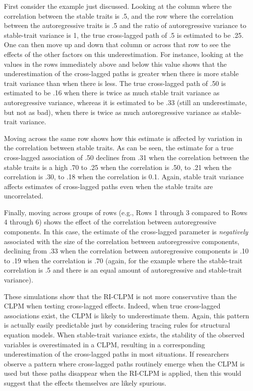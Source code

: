\documentclass[
  english,
  man,floatsintext]{apa6}
\begin{document}
First consider the example just discussed. Looking at the column where the correlation between the stable traits is .5, and the row where the correlation between the autoregressive traits is .5 and the ratio of autoregressive variance to stable-trait variance is 1, the true cross-lagged path of .5 is estimated to be .25. One can then move up and down that column or across that row to see the effects of the other factors on this underestimation. For instance, looking at the values in the rows immediately above and below this value shows that the underestimation of the cross-lagged paths is greater when there is more stable trait variance than when there is less. The true cross-lagged path of .50 is estimated to be .16 when there is twice as much stable trait variance as autoregressive variance, whereas it is estimated to be .33 (still an underestimate, but not as bad), when there is twice as much autoregressive variance as stable-trait variance.

Moving across the same row shows how this estimate is affected by variation in the correlation between stable traits. As can be seen, the estimate for a true cross-lagged association of .50 declines from .31 when the correlation between the stable traits is a high .70 to .25 when the correlation is .50, to .21 when the correlation is .30, to .18 when the correlation is 0.1. Again, stable trait variance affects estimates of cross-lagged paths even when the stable traits are uncorrelated.

Finally, moving across groups of rows (e.g., Rows 1 through 3 compared to Rows 4 through 6) shows the effect of the correlation between autoregressive components. In this case, the estimate of the cross-lagged parameter is \emph{negatively} associated with the size of the correlation between autoregressive components, declining from .33 when the correlation between autoregressive components is .10 to .19 when the correlation is .70 (again, for the example where the stable-trait correlation is .5 and there is an equal amount of autoregressive and stable-trait variance).

These simulations show that the RI-CLPM is not more conservative than the CLPM when testing cross-lagged effects. Indeed, when true cross-lagged associations exist, the CLPM is likely to underestimate them. Again, this pattern is actually easily predictable just by considering tracing rules for structural equation models. When stable-trait variance exists, the stability of the observed variables is overestimated in a CLPM, resulting in a corresponding underestimation of the cross-lagged paths in most situations. If researchers observe a pattern where cross-lagged paths routinely emerge when the CLPM is used but these paths disappear when the RI-CLPM is applied, then this would suggest that the effects themselves are likely spurious.
\end{document}
